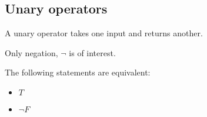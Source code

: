 
\subsection{Unary operators}

A unary operator takes one input and returns another.

Only negation, \(\neg \) is of interest.

The following statements are equivalent:

\begin{itemize}
\item \(T\)
\item \(\neg F\)
\end{itemize}


